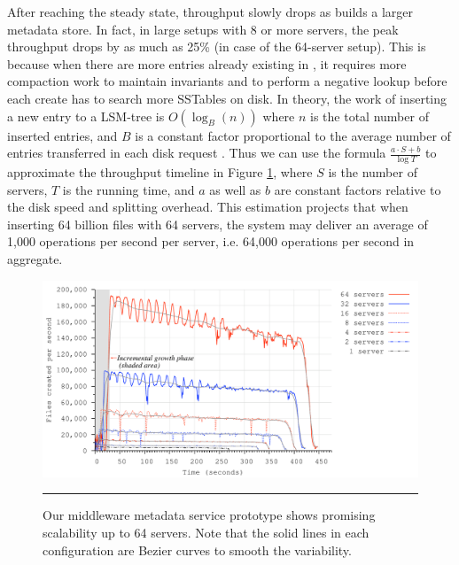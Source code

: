 After reaching the steady state, throughput slowly drops as \ldb builds a
larger metadata store.
In fact, in large setups with 8 or more servers, 
the peak throughput drops by as much as 25\% (in case of the 64-server setup).
This is because when there are more entries already existing in \ldb, 
it requires more compaction work to maintain \ldb invariants and to perform a 
negative lookup before each create has to search more SSTables on disk. 
In theory, the work of inserting a new entry to a LSM-tree is $O(\log_{B}(n))$
where $n$ is the total number of inserted entries, and $B$ is a constant factor
proportional to the average number of entries transferred in each disk request
\cite{Bender2007}.
Thus we can use the formula $\frac{a\cdot S+b}{\log{T}}$ to
approximate the throughput timeline in Figure \ref{graph:ldb-scaling},
where $S$ is the number of servers, $T$ is the running time, and $a$ as well as $b$ 
are constant factors relative to the disk speed and splitting overhead.
This estimation projects that when inserting 64 billion files with 64 servers,
the system may deliver an average of 1,000 operations per second per server,
i.e. 64,000 operations per second in aggregate.

\begin{figure}[t]  %
\centerline{\includegraphics[scale=0.33]{./figs/ldb_insertrate}}
\caption{
{\small
Our middleware metadata service prototype shows promising scalability
up to 64 servers. 
Note that the solid lines in each configuration are Bezier
curves to smooth the variability.
}
}
\vspace{10pt}
\hrule 
\label{graph:ldb-scaling}
\end{figure}       %

